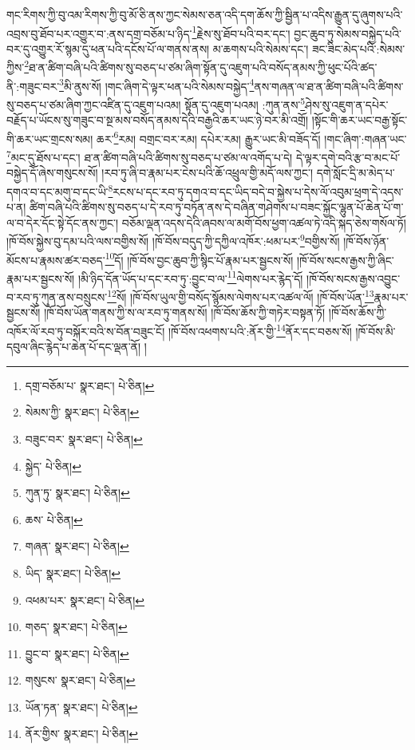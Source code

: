 གང་རིགས་ཀྱི་བུ་འམ་རིགས་ཀྱི་བུ་མོ་ཅི་ནས་ཀྱང་སེམས་ཅན་འདི་དག་ཆོས་ཀྱི་སྦྱིན་པ་འདིས་རྒྱུན་དུ་ཞུགས་པའི་འབྲས་བུ་ཐོབ་པར་འགྱུར་བ་:ནས་དགྲ་བཅོམ་པ་ཉིད་\footnote{དགྲ་བཅོམ་པ་  སྣར་ཐང་།  པེ་ཅིན། }རྗེས་སུ་ཐོབ་པའི་བར་དང་། བྱང་ཆུབ་ཏུ་སེམས་བསྐྱེད་པའི་བར་དུ་འགྱུར་རོ་སྙམ་དུ་ཕན་པའི་དངོས་པོ་ལ་གནས་ནས། མ་ཆགས་པའི་སེམས་དང་། ཟང་ཟིང་མེད་པའི་:སེམས་ཀྱིས་\footnote{སེམས་ཀྱི་  སྣར་ཐང་།  པེ་ཅིན། }ཐ་ན་ཚིག་བཞི་པའི་ཚིགས་སུ་བཅད་པ་ཙམ་ཞིག་སྟོན་དུ་འཇུག་པའི་བསོད་ནམས་ཀྱི་ཕུང་པོའི་ཚད་ནི་:གཟུང་བར་\footnote{བཟུང་བར་  སྣར་ཐང་།  པེ་ཅིན། }མི་ནུས་སོ། །གང་ཞིག་དེ་ལྟར་ཕན་པའི་སེམས་བསྐྱེད་\footnote{སྐྱེད་  པེ་ཅིན། }ནས་གཞན་ལ་ཐ་ན་ཚིག་བཞི་པའི་ཚིགས་སུ་བཅད་པ་ཙམ་ཞིག་ཀྱང་འཛིན་དུ་འཇུག་པའམ། སྟོན་དུ་འཇུག་པའམ། :ཀུན་ནས་\footnote{ཀུན་ཏུ་  སྣར་ཐང་།  པེ་ཅིན། }ཤེས་སུ་འཇུག་ན་དཔེར་བརྗོད་པ་ཡོངས་སུ་གཟུང་བ་སྔ་མས་བསོད་ནམས་དེའི་བརྒྱའི་ཆར་ཡང་ཉེ་བར་མི་འགྲོ། །སྟོང་གི་ཆར་ཡང་བརྒྱ་སྟོང་གི་ཆར་ཡང་གྲངས་སམ། ཆར་\footnote{ཆས་  པེ་ཅིན། }རམ། བགྲང་བར་རམ། དཔེར་རམ། རྒྱུར་ཡང་མི་བཟོད་དོ། །གང་ཞིག་:གཞན་ཡང་\footnote{གཞན་  སྣར་ཐང་།  པེ་ཅིན། }མང་དུ་ཐོས་པ་དང་། ཐ་ན་ཚིག་བཞི་པའི་ཚིགས་སུ་བཅད་པ་ཙམ་ལ་འགོད་པ་དེ། དེ་ལྟར་དགེ་བའི་རྩ་བ་མང་པོ་བསྐྱེད་དོ་ཞེས་གསུངས་སོ། །རབ་ཏུ་ཞི་བ་རྣམ་པར་ངེས་པའི་ཆོ་འཕྲུལ་གྱི་མདོ་ལས་ཀྱང་། དགེ་སློང་དྲི་མ་མེད་པ་དགའ་བ་དང་མགུ་བ་དང་ཡི་\footnote{ཡིད་  སྣར་ཐང་།  པེ་ཅིན། }རངས་པ་དང་རབ་ཏུ་དགའ་བ་དང་ཡིད་བདེ་བ་སྐྱེས་པ་དེས་ལོ་འབུམ་ཕྲག་དེ་འདས་པ་ན། ཚིག་བཞི་པའི་ཚིགས་སུ་བཅད་པ་དེ་རབ་ཏུ་བཏོན་ནས་དེ་བཞིན་གཤེགས་པ་བཟང་སྐྱོང་ལྷུན་པོ་ཆེན་པོ་ག་ལ་བ་དེར་དོང་སྟེ་དོང་ནས་ཀྱང་། བཅོམ་ལྡན་འདས་དེའི་ཞབས་ལ་མགོ་བོས་ཕྱག་འཚལ་ཏེ་འདི་སྐད་ཅེས་གསོལ་ཏོ། །ཁོ་བོས་སྐྱེས་བུ་དམ་པའི་ལས་བགྱིས་སོ། །ཁོ་བོས་བདུད་ཀྱི་དཀྱིལ་འཁོར་:ཕམ་པར་\footnote{འཕམ་པར་  སྣར་ཐང་།  པེ་ཅིན། }བགྱིས་སོ། །ཁོ་བོས་ཉོན་མོངས་པ་རྣམས་ཚར་བཅད་\footnote{གཅད་  སྣར་ཐང་།  པེ་ཅིན། }དོ། །ཁོ་བོས་བྱང་ཆུབ་ཀྱི་སྙིང་པོ་རྣམ་པར་སྦྱངས་སོ། །ཁོ་བོས་སངས་རྒྱས་ཀྱི་ཞིང་རྣམ་པར་སྦྱངས་སོ། །མི་ཉིད་དོན་ཡོད་པ་དང་རབ་ཏུ་:བྱུང་བ་ལ་\footnote{བྱུང་བ་  སྣར་ཐང་།  པེ་ཅིན། }ལེགས་པར་རྙེད་དོ། །ཁོ་བོས་སངས་རྒྱས་འབྱུང་བ་རབ་ཏུ་ཀུན་ནས་བསྲུངས་\footnote{གསུངས་  སྣར་ཐང་།  པེ་ཅིན། }སོ། །ཁོ་བོས་ཡུལ་གྱི་བསོད་སྙོམས་ལེགས་པར་འཚལ་ལོ། །ཁོ་བོས་ཡོན་\footnote{ཡོན་ཏན་  སྣར་ཐང་།  པེ་ཅིན། }རྣམ་པར་སྦྱངས་སོ། །ཁོ་བོས་ཡོན་གནས་ཀྱི་ས་ལ་རབ་ཏུ་གནས་སོ། །ཁོ་བོས་ཆོས་ཀྱི་གཏེར་བསྟན་ཏོ། །ཁོ་བོས་ཆོས་ཀྱི་འཁོར་ལོ་རབ་ཏུ་བསྐོར་བའི་ས་བོན་བཟུང་ངོ། །ཁོ་བོས་འཕགས་པའི་:ནོར་གྱི་\footnote{ནོར་གྱིས་  སྣར་ཐང་།  པེ་ཅིན། }ནོར་དང་བཅས་སོ། །ཁོ་བོས་མི་དབུལ་ཞིང་རྙེད་པ་ཆེན་པོ་དང་ལྡན་ནོ། །
